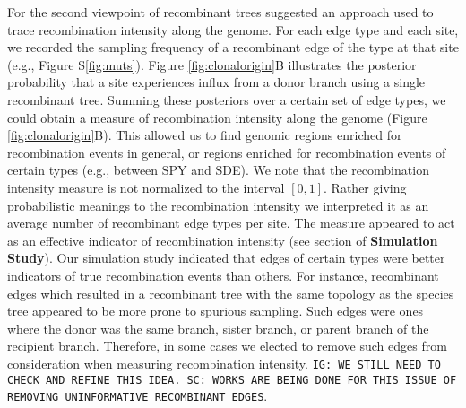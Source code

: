 \documentclass[english]{article}
\begin{document}
For the second viewpoint of recombinant trees
\citet{Didelot2010} suggested an approach used to trace
recombination intensity along the genome. 
For each edge type and each site, we recorded the sampling frequency of a 
recombinant edge of the type at that site (e.g., Figure S\ref{fig:muts}).
Figure \ref{fig:clonalorigin}B illustrates the posterior probability that a site
experiences influx from a donor branch using a single recombinant tree.
Summing these posteriors over a certain set of edge 
types, we could obtain a measure of recombination intensity along the genome 
(Figure \ref{fig:clonalorigin}B). 
This allowed us to find genomic regions enriched for recombination events in general, 
or regions enriched for recombination events of certain types (e.g.,
between SPY and SDE).  We note that the recombination intensity measure is not 
normalized to the interval $[0,1]$. Rather giving probabilistic meanings to the
recombination intensity we interpreted it as an average number of recombinant
edge types per site.
The measure appeared to act as an 
effective indicator of recombination intensity 
(see section of \textbf{Simulation Study}). 
Our simulation study indicated that edges of certain types were better indicators of 
true recombination events than others. For instance, recombinant edges which 
resulted in a recombinant tree with the same topology as the species tree appeared to 
be more prone to spurious sampling. 
Such edges were ones where the donor was the 
same branch, sister branch, or parent branch of the recipient branch. 
Therefore, in some cases we elected to remove such edges from consideration 
when measuring recombination intensity.
\texttt{IG: WE STILL NEED TO CHECK AND REFINE THIS IDEA. SC: WORKS ARE BEING DONE
FOR THIS ISSUE OF REMOVING UNINFORMATIVE RECOMBINANT EDGES}.
\end{document}
